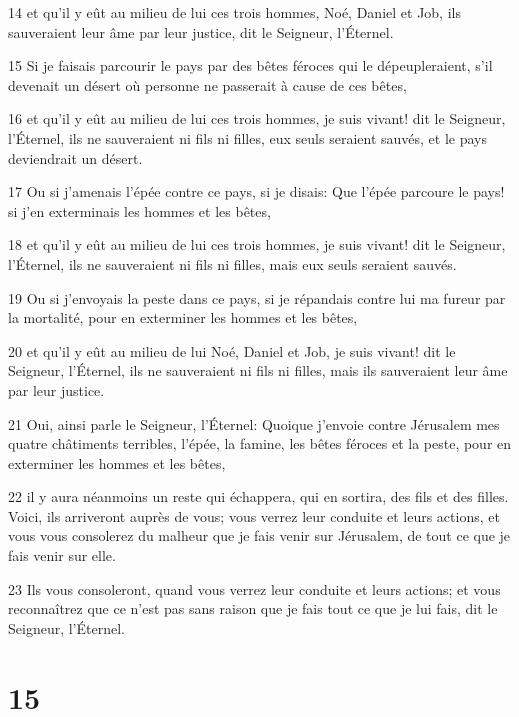 \par 14 et qu'il y eût au milieu de lui ces trois hommes, Noé, Daniel et Job, ils sauveraient leur âme par leur justice, dit le Seigneur, l'Éternel.
\par 15 Si je faisais parcourir le pays par des bêtes féroces qui le dépeupleraient, s'il devenait un désert où personne ne passerait à cause de ces bêtes,
\par 16 et qu'il y eût au milieu de lui ces trois hommes, je suis vivant! dit le Seigneur, l'Éternel, ils ne sauveraient ni fils ni filles, eux seuls seraient sauvés, et le pays deviendrait un désert.
\par 17 Ou si j'amenais l'épée contre ce pays, si je disais: Que l'épée parcoure le pays! si j'en exterminais les hommes et les bêtes,
\par 18 et qu'il y eût au milieu de lui ces trois hommes, je suis vivant! dit le Seigneur, l'Éternel, ils ne sauveraient ni fils ni filles, mais eux seuls seraient sauvés.
\par 19 Ou si j'envoyais la peste dans ce pays, si je répandais contre lui ma fureur par la mortalité, pour en exterminer les hommes et les bêtes,
\par 20 et qu'il y eût au milieu de lui Noé, Daniel et Job, je suis vivant! dit le Seigneur, l'Éternel, ils ne sauveraient ni fils ni filles, mais ils sauveraient leur âme par leur justice.
\par 21 Oui, ainsi parle le Seigneur, l'Éternel: Quoique j'envoie contre Jérusalem mes quatre châtiments terribles, l'épée, la famine, les bêtes féroces et la peste, pour en exterminer les hommes et les bêtes,
\par 22 il y aura néanmoins un reste qui échappera, qui en sortira, des fils et des filles. Voici, ils arriveront auprès de vous; vous verrez leur conduite et leurs actions, et vous vous consolerez du malheur que je fais venir sur Jérusalem, de tout ce que je fais venir sur elle.
\par 23 Ils vous consoleront, quand vous verrez leur conduite et leurs actions; et vous reconnaîtrez que ce n'est pas sans raison que je fais tout ce que je lui fais, dit le Seigneur, l'Éternel.

\chapter{15}

